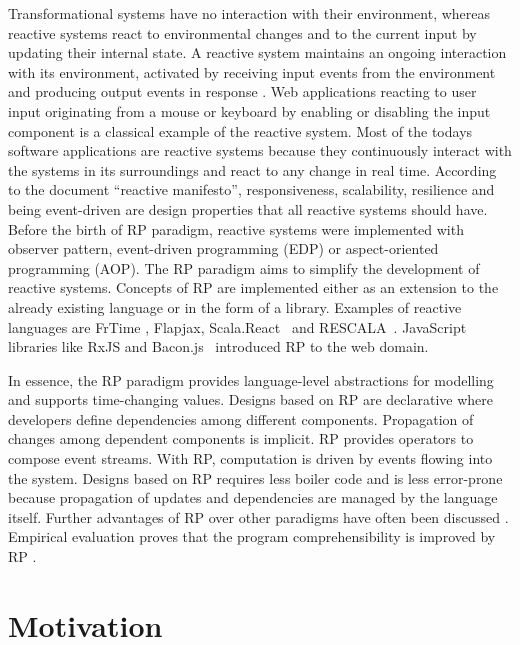 Transformational systems have no interaction with their environment, whereas reactive systems react to environmental changes and to the current input by updating their internal state. A reactive system maintains an ongoing interaction with its environment, activated by receiving input events from the environment and producing output events in response \cite{674156}. Web applications reacting to user input originating from a mouse or keyboard by enabling or disabling the input component is a classical example of the reactive system. 
Most of the today\textquotesingle s software applications are reactive systems because they continuously interact with the systems in its surroundings and react to any change in real time. According to the document ``reactive manifesto''\cite{reactiveManifesto}, responsiveness, scalability, resilience and being event-driven are design properties that all reactive systems should have. 
Before the birth of RP paradigm, reactive systems were implemented with observer pattern, event-driven programming (EDP) or aspect-oriented programming (AOP).
The RP paradigm aims to simplify the development of reactive systems.
Concepts of RP are implemented either as an extension to the already existing language or in the form of a library. Examples of reactive languages are FrTime \cite{Cooper2006}, Flapjax\cite{Meyerovich:2009:FPL:1639949.1640091}, Scala.React~\cite{EPFL-REPORT-176887} and RESCALA~\cite{Salvaneschi:2014:RBO:2577080.2577083}. JavaScript libraries like RxJS\cite{reactivex} and Bacon.js~\cite{BaconJs} introduced RP to the web domain. 

In essence, the RP paradigm provides language-level abstractions for modelling and supports time-changing values. 
Designs based on RP are declarative where developers define dependencies among different components.
Propagation of changes among dependent components is implicit. RP provides operators to compose event streams. With RP, computation is driven by events flowing into the system.
Designs based on RP requires less boiler code and is less error-prone because propagation of updates and dependencies are managed by the language itself. Further advantages of RP over other paradigms have often been discussed \cite{Cooper2006,Meyerovich:2009:FPL:1639949.1640091,EPFL-REPORT-176887,Bainomugisha:2013:SRP:2501654.2501666}. 
Empirical evaluation proves that the program comprehensibility
is improved by RP \cite{7827078}.
\section{Motivation}

